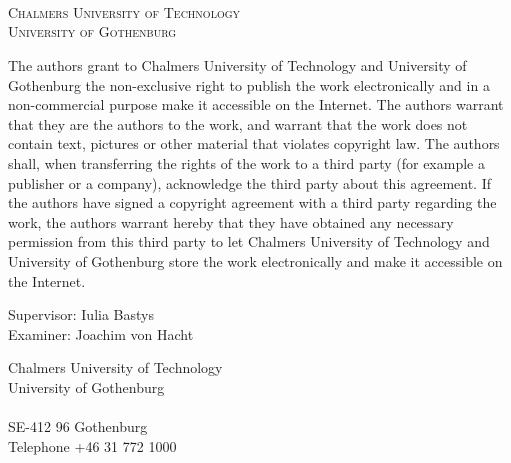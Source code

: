 \newpage
\thispagestyle{empty}
\begin{center}

	\textbf{\Large \ambaTitle} \\[1cm]

    {\linespread{1.2}\large
        \StrSubstitute{\ambaAuthors}{,}{\\}
        \\
    }
	
	\vfill 	

	\ambaDepartment \\
	\textsc{Chalmers University of Technology} \\
	\textsc{University of Gothenburg} \\
	\ambaCityCountryYear
\end{center}


\newpage
{The authors grant to Chalmers University of Technology and University of Gothenburg the
non-exclusive right to publish the work electronically and in a non-commercial purpose make it
accessible on the Internet. The authors warrant that they are the authors to the work, and
warrant that the work does not contain text, pictures or other material that violates
copyright law.
The authors shall, when transferring the rights of the work to a third party (for example a
publisher or a company), acknowledge the third party about this agreement. If the authors have
signed a copyright agreement with a third party regarding the work, the authors warrant
hereby that they have obtained any necessary permission from this third party to let Chalmers
University of Technology and University of Gothenburg store the work electronically and make
it accessible on the Internet.}

Supervisor: Iulia Bastys \\
Examiner: Joachim von Hacht \setlength{\parskip}{1cm}

Chalmers University of Technology\\
University of Gothenburg\\
\ambaDepartment \\
SE-412 96 Gothenburg\\
Telephone +46 31 772 1000 \setlength{\parskip}{0.5cm}

\vfill
\ambaCityCountryYear
